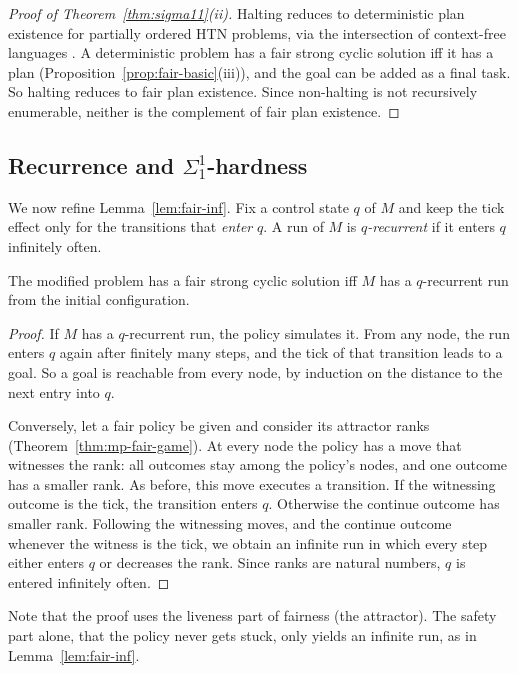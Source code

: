 \begin{proof}[Proof of Theorem~\ref{thm:sigma11}(ii)]
  Halting reduces to deterministic plan existence for partially ordered HTN problems, via the
  intersection of context-free languages \parencite{erol:et:al:amai-96}. A deterministic problem
  has a fair strong cyclic solution iff it has a plan (Proposition~\ref{prop:fair-basic}(iii)), and
  the goal can be added as a final task. So halting reduces to fair plan existence. Since
  non-halting is not recursively enumerable, neither is the complement of fair plan existence.
\end{proof}

\subsection{Recurrence and $\Sigma^1_1$-hardness}

We now refine Lemma~\ref{lem:fair-inf}. Fix a control state $q$ of $M$ and keep the tick effect only
for the transitions that \emph{enter} $q$. A run of $M$ is \emph{$q$-recurrent} if it enters $q$
infinitely often.

\begin{lemma}\label{lem:fair-rec}
  The modified problem has a fair strong cyclic solution iff $M$ has a $q$-recurrent run from the
  initial configuration.
\end{lemma}

\begin{proof}
  If $M$ has a $q$-recurrent run, the policy simulates it. From any node, the run enters $q$
  again after finitely many steps, and the tick of that transition leads to a goal. So a goal is
  reachable from every node, by induction on the distance to the next entry into $q$.

  Conversely, let a fair policy be given and consider its attractor ranks
  (Theorem~\ref{thm:mp-fair-game}). At every node the policy has a move that witnesses the rank:
  all outcomes stay among the policy's nodes, and one outcome has a smaller rank. As before, this
  move executes a transition. If the witnessing outcome is the tick, the transition enters $q$.
  Otherwise the continue outcome has smaller rank. Following the witnessing moves, and the continue
  outcome whenever the witness is the tick, we obtain an infinite run in which every step either
  enters $q$ or decreases the rank. Since ranks are natural numbers, $q$ is entered infinitely
  often.
\end{proof}

Note that the proof uses the liveness part of fairness (the attractor). The safety part alone,
that the policy never gets stuck, only yields an infinite run, as in Lemma~\ref{lem:fair-inf}.

